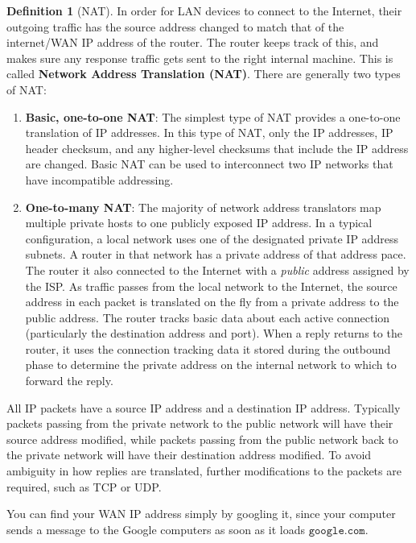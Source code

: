 \documentclass[a4paper, 12pt]{report}
\theoremstyle{remark}
\theoremstyle{definition}
\newtheorem{definition}{Definition}[section]
\begin{document}
\begin{definition}[NAT]
In order for LAN devices to connect to the Internet, their outgoing traffic has the source address changed to match that of the internet/WAN IP address of the router. The router keeps track of this, and makes sure any response traffic gets sent to the right internal machine. This is called \textbf{Network Address Translation (NAT)}. There are generally two types of NAT: 
\begin{enumerate}
    \item \textbf{Basic, one-to-one NAT}: The simplest type of NAT provides a one-to-one translation of IP addresses. In this type of NAT, only the IP addresses, IP header checksum, and any higher-level checksums that include the IP address are changed. Basic NAT can be used to interconnect two IP networks that have incompatible addressing. 
    \item \textbf{One-to-many NAT}: The majority of network address translators map multiple private hosts to one publicly exposed IP address. In a typical configuration, a local network uses one of the designated private IP address subnets. A router in that network has a private address of that address pace. The router it also connected to the Internet with a \textit{public} address assigned by the ISP. As traffic passes from the local network to the Internet, the source address in each packet is translated on the fly from a private address to the public address. The router tracks basic data about each active connection (particularly the destination address and port). When a reply returns to the router, it uses the connection tracking data it stored during the outbound phase to determine the private address on the internal network to which to forward the reply. 
\end{enumerate}
All IP packets have a source IP address and a destination IP address. Typically packets passing from the private network to the public network will have their source address modified, while packets passing from the public network back to the private network will have their destination address modified. To avoid ambiguity in how replies are translated, further modifications to the packets are required, such as TCP or UDP. 
\end{definition}

You can find your WAN IP address simply by googling it, since your computer sends a message to the Google computers as soon as it loads $\texttt{google.com}$. 
\end{document}
